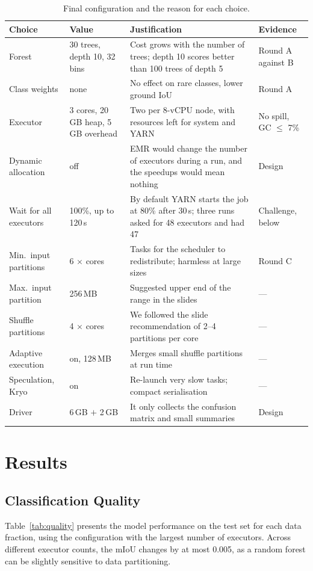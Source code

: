 \documentclass[a4paper, 11pt]{article} %
\begin{document}
\begin{table}[H]
\centering
\footnotesize
\begin{tabular}{@{}p{3.6cm}p{2.4cm}p{5.1cm}p{3.3cm}@{}}
\hline
Choice & Value & Justification & Evidence \\
\hline
Forest & 30 trees, depth 10, 32 bins & Cost grows with the number of trees; depth 10 scores better than 100 trees of depth 5 & Round A against B \\
Class weights & none & No effect on rare classes, lower ground IoU & Round A \\
Executor & 3 cores, 20\,GB heap, 5\,GB overhead & Two per 8-vCPU node, with resources left for system and YARN & No spill, GC $\le$ 7\% \\
Dynamic allocation & off & EMR would change the number of executors during a run, and the speedups would mean nothing & Design \\
Wait for all executors & 100\%, up to 120\,s & By default YARN starts the job at 80\% after 30\,s; three runs asked for 48 executors and had 47 & Challenge, below \\
Min.\ input partitions & 6 $\times$ cores & Tasks for the scheduler to redistribute; harmless at large sizes & Round C \\
Max.\ input partition & 256\,MB & Suggested upper end of the range in the slides & --- \\
Shuffle partitions & 4 $\times$ cores & We followed the slide recommendation of 2--4 partitions per core & --- \\
Adaptive execution & on, 128\,MB & Merges small shuffle partitions at run time & --- \\
Speculation, Kryo & on & Re-launch very slow tasks; compact serialisation & --- \\
Driver & 6\,GB $+$ 2\,GB & It only collects the confusion matrix and small summaries & Design \\
\hline
\end{tabular}
\caption{Final configuration and the reason for each choice.}
\label{tab:settings}
\end{table}

\section{Results}
\label{sec:results}

\subsection{Classification Quality}
Table~\ref{tab:quality} presents the model performance on the test set for each data fraction, using the configuration with the largest number of executors. Across different executor counts, the mIoU changes by at most 0.005, as a random forest can be slightly sensitive to data partitioning.
\end{document}
